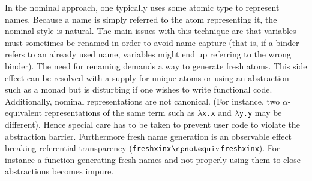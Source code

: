 \documentclass[9pt,preprint,authoryear]{sigplanconf}
\begin{document}
%
In the nominal approach, one typically uses some atomic type to
    represent names. Because a name is simply referred to
    the atom representing it, the nominal style is
    natural. The main issues with this technique are that variables
    must sometimes be renamed in order to avoid name capture (that is,
    if a binder refers to an already used name, variables might end up
    referring to the wrong binder). The need for renaming demands a way
    to generate fresh atoms. This side effect can be resolved with a
    supply for unique atoms or using an abstraction such as a monad
    but is disturbing if one wishes to write functional code.
    Additionally, nominal representations are not canonical. (For instance, two $ \alpha $-equivalent 
    representations of the same term such as \textcolor[cmyk]{0,0.65,0.99,0}{\texttt{$ \lambda $}}\textcolor[rgb]{0,0,0.80}{\texttt{x}}\textcolor[cmyk]{0,0.65,0.99,0}{\texttt{.}}\textcolor[rgb]{0,0,0.80}{\texttt{x}} and \textcolor[cmyk]{0,0.65,0.99,0}{\texttt{$ \lambda $}}\textcolor[rgb]{0,0,0.80}{\texttt{y}}\textcolor[cmyk]{0,0.65,0.99,0}{\texttt{.}}\textcolor[rgb]{0,0,0.80}{\texttt{y}} may 
    be different). Hence special care has to be taken to prevent user code
    to violate the abstraction barrier. Furthermore fresh name
    generation is an observable effect breaking referential transparency
    (\textcolor[cmyk]{0,0.65,0.99,0}{\texttt{fresh}}\textcolor[rgb]{0,0,0.80}{\texttt{\mbox{\hspace{0.50em}}}}\textcolor[rgb]{0,0,0.80}{\texttt{x}}\textcolor[rgb]{0,0,0.80}{\texttt{\mbox{\hspace{0.50em}}}}\textcolor[cmyk]{0,0.65,0.99,0}{\texttt{in}}\textcolor[rgb]{0,0,0.80}{\texttt{\mbox{\hspace{0.50em}}}}\textcolor[rgb]{0,0,0.80}{\texttt{x}}\textcolor[rgb]{0,0,0.80}{\texttt{\mbox{\hspace{0.50em}}}}\textcolor[cmyk]{0,0.65,0.99,0}{\texttt{\ensuremath{\npnotequiv}}}\textcolor[rgb]{0,0,0.80}{\texttt{\mbox{\hspace{0.50em}}}}\textcolor[cmyk]{0,0.65,0.99,0}{\texttt{fresh}}\textcolor[rgb]{0,0,0.80}{\texttt{\mbox{\hspace{0.50em}}}}\textcolor[rgb]{0,0,0.80}{\texttt{x}}\textcolor[rgb]{0,0,0.80}{\texttt{\mbox{\hspace{0.50em}}}}\textcolor[cmyk]{0,0.65,0.99,0}{\texttt{in}}\textcolor[rgb]{0,0,0.80}{\texttt{\mbox{\hspace{0.50em}}}}\textcolor[rgb]{0,0,0.80}{\texttt{x}}). For instance a function
    generating fresh names and not properly using them to close
    abstractions becomes impure.%
\end{document}
